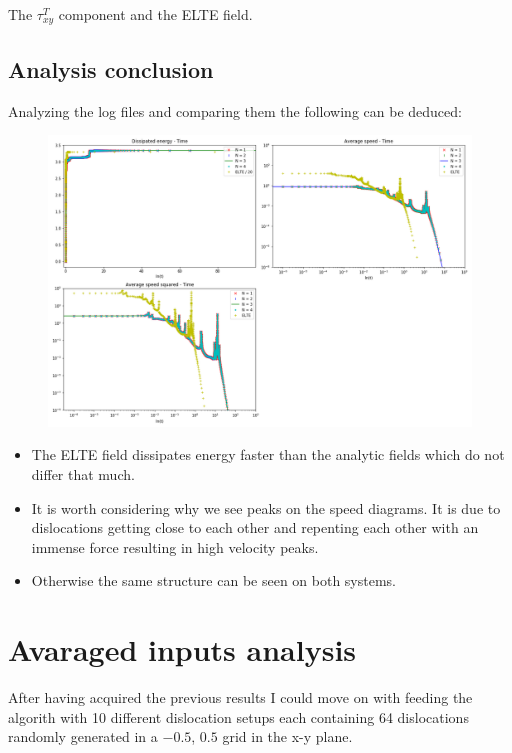 \documentclass[12pt,a4paper]{article}
\theoremstyle{plain}
\begin{document}
\begin{multicols*}{2}
	\par The ${\tau}^{T}_{xy}$ component and the ELTE field.

	\subsection{Analysis conclusion}

	\par Analyzing the log files and comparing them the following can be deduced:

	\begin{figure}[H]
		\centering
		\includegraphics[width=0.95\columnwidth]{all.png}
	\end{figure}

	\begin{itemize}
		\item The ELTE field dissipates energy faster than the analytic fields which do not differ that much.
		\item It is worth considering why we see peaks on the speed diagrams. It is due to dislocations getting close to each other and repenting each other with an immense force resulting in high velocity peaks.
		\item Otherwise the same structure can be seen on both systems.
	\end{itemize}

	\section{Avaraged inputs analysis}

	\par After having acquired the previous results I could move on with feeding
	the algorith with 10 different dislocation setups each containing 64 dislocations
	randomly generated in a $-0.5$, $0.5$ grid in the x-y plane.


\end{multicols*}
\end{document}
